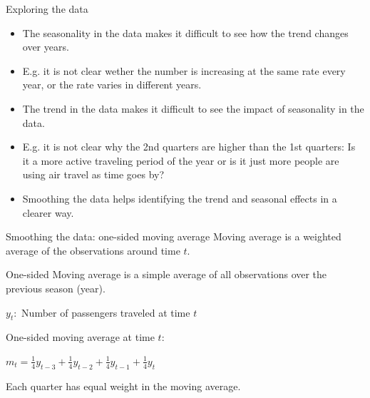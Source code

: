 \documentclass{beamer}\usepackage[]{graphicx}\usepackage[]{color}
\begin{document}
\begin{darkframes}
\begin{frame}[fragile]{Exploring the data}
\begin{itemize}[<+->]
        \item The seasonality in the data makes it difficult to see how the trend changes over years.
        
        \item E.g. it is not clear wether the number is increasing at the same rate every year, or the rate varies in different years. 
        
        \item The trend in the data makes it difficult to see the impact of seasonality in the data. 
        
        \item E.g. it is not clear why the 2nd quarters are higher than the 1st quarters: Is it a more active traveling period of the year or is it just more people are using air travel as time goes by?
        
        \item Smoothing the data helps identifying the trend and seasonal effects in a clearer way.
      \end{itemize}
    \end{frame}
    
    
    
    \begin{frame}[fragile]{Smoothing the data: one-sided moving average}
    \fontsize{9}{9}\selectfont
        \alert{Moving average} is a weighted average of the observations around time $t$. 
        \bigskip
        
        \alert{One-sided Moving average} is a simple average of all observations over the previous season (year).
        
        \begin{center}
          $y_t:$ Number of passengers traveled at time $t$
        \end{center}  
        
        One-sided moving average at time $t$:
        
        \begin{center}
          $m_t = \frac{1}{4} y_{t-3} + \frac{1}{4} y_{t-2} + \frac{1}{4} y_{t-1} + \frac{1}{4} y_{t}$
        \end{center}  
        Each quarter has equal weight in the moving average.
        
    \end{frame}
    
    
    

\end{darkframes}
\end{document}
